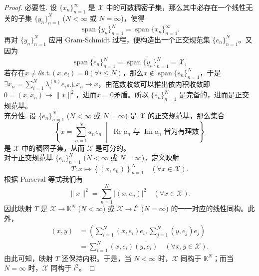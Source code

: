 \documentclass[lang=cn,newtx,10pt,scheme=chinese,thmcnt=chapter]{elegantbook}
\begin{document}
\begin{proof}
必要性. 设 $\{x_n\}_{n=1}^\infty$ 是 $\mathscr{X}$ 中的可数稠密子集，那么其中必存在一个线性无关的子集 $\{y_n\}_{n=1}^N$ ($N < \infty$ 或 $N = \infty$)，使得
\begin{equation*}
\operatorname{span} \{y_n\}_{n=1}^N = \operatorname{span} \{x_n\}_{n=1}^\infty.
\end{equation*}
再对 $\{y_n\}_{n=1}^N$ 应用 Gram-Schmidt 过程，便构造出一个正交规范集 $\{e_n\}_{n=1}^N$。又因为
\begin{equation*}
\overline{\operatorname{span} \{e_n\}_{n=1}^N} = \overline{\operatorname{span} \{y_n\}_{n=1}^N} = \mathscr{X},
\end{equation*}
若存在$x\neq \theta $s.t.$(x,e_i)=0(\forall i\leqslant N )$，那么$x\notin \operatorname{span}\{e_n\}_{n=1}^N$，于是$\exists x_n=\sum\limits_{i=1}^{N}\lambda_i^{(n)}e_i$s.t.$x_n\to x$，由范数收敛可以推出依内积收敛即$0=(x,x_n)\to \|x\|^2$，进而$x=0$矛盾。所以 $\{e_n\}_{n=1}^N$ 是完备的，进而是正交规范基。\\
充分性. 设 $\{e_n\}_{n=1}^N$ ($N < \infty$ 或 $N = \infty$) 是 $\mathscr{X}$ 的正交规范基，那么集合
\begin{equation*}
\left\{x = \sum_{n=1}^N a_n e_n \;\middle|\; \operatorname{Re} a_n \text{ 与 } \operatorname{Im} a_n \text{ 皆为有理数} \right\}
\end{equation*}
是 $\mathscr{X}$ 中的稠密子集，从而 $\mathscr{X}$ 是可分的。\\
对于正交规范基 $\{e_n\}_{n=1}^N$ ($N < \infty$ 或 $N = \infty$)，定义映射
\begin{equation*}
T: x \mapsto \left\{\left(x, e_n\right)\right\}_{n=1}^N \quad (\forall x \in \mathscr{X}).
\end{equation*}
根据 Parseval 等式我们有
\begin{equation*}
\|x\|^2 = \sum_{n=1}^N \left|\left(x, e_n\right)\right|^2 \quad (\forall x \in \mathscr{X}).
\end{equation*}
因此映射 $T$ 是 $\mathscr{X} \rightarrow \mathbb{K}^N$ ($N < \infty$) 或 $\mathscr{X} \rightarrow l^2$ ($N = \infty$) 的一一对应的线性同构。此外，
\begin{equation*}
\begin{aligned}
(x, y) &= \left(\sum_{i=1}^N \left(x, e_i\right) e_i, \sum_{j=1}^N \left(y, e_j\right) e_j\right) \\
&= \sum_{i=1}^N \left(x, e_i\right) \overline{\left(y, e_i\right)} \quad (\forall x, y \in \mathscr{X}).
\end{aligned}
\end{equation*}
由此可知，映射 $T$ 还保持内积。于是，当 $N < \infty$ 时，$\mathscr{X}$ 同构于 $\mathbb{K}^N$；而当 $N = \infty$ 时，$\mathscr{X}$ 同构于 $l^2$。
\end{proof}
\end{document}
